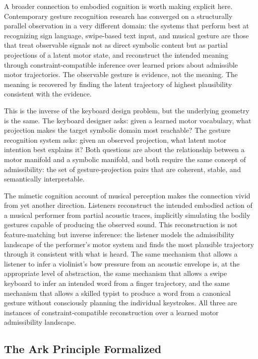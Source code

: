 \documentclass[12pt,a4paper]{article}
\theoremstyle{plain}
\theoremstyle{definition}
\theoremstyle{remark}
\begin{document}
A broader connection to embodied cognition is worth making explicit here.
Contemporary gesture recognition research has converged on a structurally
parallel observation in a very different domain: the systems that perform
best at recognizing sign language, swipe-based text input, and musical gesture
are those that treat observable signals not as direct symbolic content but as
partial projections of a latent motor state, and reconstruct the intended
meaning through constraint-compatible inference over learned priors about
admissible motor trajectories. The observable gesture is evidence, not the
meaning. The meaning is recovered by finding the latent trajectory of highest
plausibility consistent with the evidence.

This is the inverse of the keyboard design problem, but the underlying geometry
is the same. The keyboard designer asks: given a learned motor vocabulary, what
projection makes the target symbolic domain most reachable? The gesture
recognition system asks: given an observed projection, what latent motor
intention best explains it? Both questions are about the relationship between
a motor manifold and a symbolic manifold, and both require the same concept
of admissibility: the set of gesture-projection pairs that are coherent, stable,
and semantically interpretable.

The mimetic cognition account of musical perception makes the connection vivid
from yet another direction. Listeners reconstruct the intended embodied action
of a musical performer from partial acoustic traces, implicitly simulating the
bodily gestures capable of producing the observed sound. This reconstruction is
not feature-matching but inverse inference: the listener models the admissibility
landscape of the performer's motor system and finds the most plausible trajectory
through it consistent with what is heard. The same mechanism that allows a
listener to infer a violinist's bow pressure from an acoustic envelope is, at
the appropriate level of abstraction, the same mechanism that allows a swipe
keyboard to infer an intended word from a finger trajectory, and the same
mechanism that allows a skilled typist to produce a word from a canonical
gesture without consciously planning the individual keystrokes. All three are
instances of constraint-compatible reconstruction over a learned motor
admissibility landscape.

\subsection{The Ark Principle Formalized}
\end{document}
